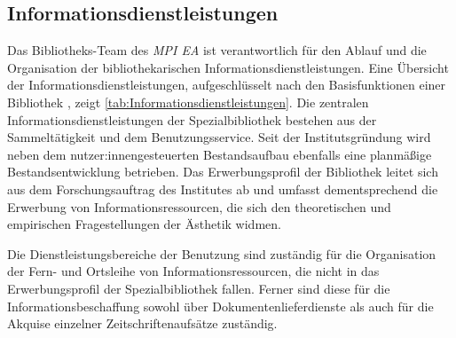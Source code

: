 \subsection{Informationsdienstleistungen}
Das Bibliotheks-Team des \textit{\acrshort{MPI EA}} ist verantwortlich für den Ablauf und die Organisation der bibliothekarischen 
Informationsdienstleistungen. Eine Übersicht der Informationsdienstleistungen,
aufgeschlüsselt nach den Basisfunktionen einer Bibliothek \cite[S. 204 f.]{rosch_bibliotheken_2019}, zeigt \autoref{tab:Informationsdienstleistungen}. 
Die zentralen Informationsdienstleistungen der Spezialbibliothek bestehen aus der Sammeltätigkeit und dem Benutzungsservice.
Seit der Institutsgründung wird neben dem nutzer:innengesteuerten Bestandsaufbau ebenfalls eine planmäßige 
Bestandsentwicklung betrieben. Das Erwerbungsprofil der Bibliothek leitet sich aus dem Forschungsauftrag des Institutes 
ab und umfasst dementsprechend die Erwerbung von Informationsressourcen, die sich den theoretischen und 
empirischen Fragestellungen der Ästhetik widmen.


Die Dienstleistungsbereiche der Benutzung sind zuständig für die Organisation der Fern- und Ortsleihe 
von Informationsressourcen, die nicht in das Erwerbungsprofil der Spezialbibliothek fallen. Ferner sind diese 
für die Informationsbeschaffung sowohl über Dokumentenlieferdienste als auch für die Akquise einzelner Zeitschriftenaufsätze zuständig.


